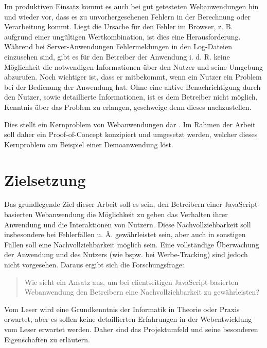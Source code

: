 Im produktiven Einsatz kommt es auch bei gut getesteten Webanwendungen hin und wieder vor, dass es zu unvorhergesehenen Fehlern in der Berechnung oder Verarbeitung kommt. Liegt die Ursache für den Fehler im Browser, z. B. aufgrund einer ungültigen Wertkombination, ist dies eine Herausforderung. Während bei Server-Anwendungen Fehlermeldungen in den Log-Dateien einzusehen sind, gibt es für den Betreiber der Anwendung i. d. R. keine Möglichkeit die notwendigen Informationen über den Nutzer und seine Umgebung abzurufen. Noch wichtiger ist, dass er mitbekommt, wenn ein Nutzer ein Problem bei der Bedienung der Anwendung hat. Ohne eine aktive Benachrichtigung durch den Nutzer, sowie detaillierte Informationen, ist es dem Betreiber nicht möglich, Kenntnis über das Problem zu erlangen, geschweige denn dieses nachzustellen.

Dies stellt ein Kernproblem von  Webanwendungen dar \cite{ClientSideMonitoringOfDistributedSystems}. Im Rahmen der Arbeit soll daher ein Proof-of-Concept konzipiert und umgesetzt werden, welcher dieses Kernproblem am Beispiel einer Demoanwendung löst.

\section{Zielsetzung}

Das grundlegende Ziel dieser Arbeit soll es sein, den Betreibern einer JavaScript-basierten Webanwendung die Möglichkeit zu geben das Verhalten ihrer Anwendung und die Interaktionen von Nutzern. Diese Nachvollziehbarkeit soll insbesondere bei Fehlerfällen u. Ä. gewährleistet sein, aber auch in sonstigen Fällen soll eine Nachvollziehbarkeit möglich sein. Eine vollständige Überwachung der Anwendung und des Nutzers (wie bspw. bei Werbe-Tracking) sind jedoch nicht vorgesehen. Daraus ergibt sich die Forschungsfrage:

\begin{quotation}
	Wie sieht ein Ansatz aus, um bei clientseitigen JavaScript-basierten Webanwendung den Betreibern eine Nachvollziehbarkeit zu gewährleisten?
\end{quotation}

Vom Leser wird eine Grundkenntnis der Informatik in Theorie oder Praxis erwartet, aber es sollen keine detaillierten Erfahrungen in der Webentwicklung vom Leser erwartet werden. Daher sind das Projektumfeld und seine besonderen Eigenschaften zu erläutern.

